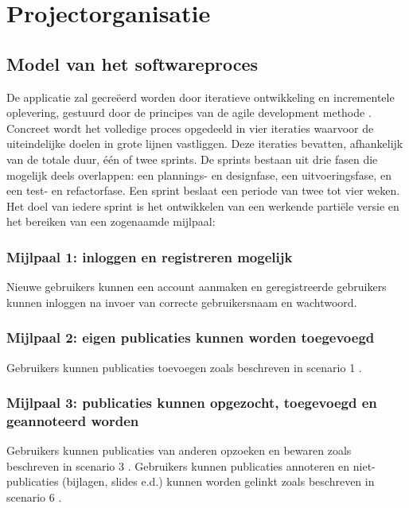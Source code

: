 \documentclass{article}
\begin{document}
 \clearpage


\section{Projectorganisatie}
\subsection{Model van het softwareproces}

De applicatie zal gecre\"{e}erd worden door iteratieve ontwikkeling en incrementele oplevering, gestuurd door de principes van de agile development methode \cite{website:agile-process} . Concreet wordt het volledige proces opgedeeld in vier iteraties waarvoor de uiteindelijke doelen in grote lijnen vastliggen. Deze iteraties bevatten, afhankelijk van de totale duur, \'{e}\'{e}n of twee sprints. De sprints bestaan uit drie fasen die mogelijk deels overlappen: een plannings- en designfase, een uitvoeringsfase, en een test- en refactorfase. Een sprint beslaat een periode van twee tot vier weken. Het doel van iedere sprint is het ontwikkelen van een werkende parti\"{e}le versie en het bereiken van een zogenaamde mijlpaal:

\subsubsection*{Mijlpaal 1: inloggen en registreren mogelijk}

Nieuwe gebruikers kunnen een account aanmaken en geregistreerde gebruikers kunnen inloggen na invoer van correcte gebruikersnaam en wachtwoord.

\subsubsection*{Mijlpaal 2: eigen publicaties kunnen worden toegevoegd}
Gebruikers kunnen publicaties toevoegen zoals beschreven in scenario 1  \citep{Xtreport:organisatie}.
\subsubsection*{Mijlpaal 3: publicaties kunnen opgezocht, toegevoegd en geannoteerd worden}
Gebruikers kunnen publicaties van anderen opzoeken en bewaren zoals beschreven in scenario 3 \citep{Xtreport:organisatie}. Gebruikers kunnen publicaties annoteren en niet-publicaties (bijlagen, slides e.d.) kunnen worden gelinkt zoals beschreven in scenario 6 \citep{Xtreport:organisatie}.
\end{document}
